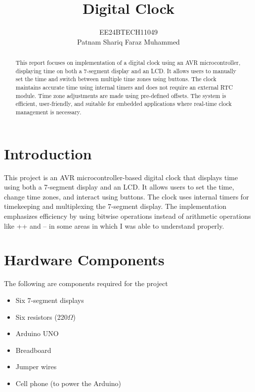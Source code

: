 \documentclass[journal]{IEEEtran}
\numberwithin{equation}{enumi}
\numberwithin{figure}{enumi}
\begin{document}


\title{Digital Clock}
\author{EE24BTECH11049 \\ Patnam Shariq Faraz Muhammed}


{\let\newpage\relax\maketitle}
\begin{abstract}
    This report focuses on implementation of a digital clock using an AVR microcontroller, displaying time on both a 7-segment display and an LCD. It allows users to manually set the time and switch between multiple time zones using buttons. The clock maintains accurate time using internal timers and does not require an external RTC module. Time zone adjustments are made using pre-defined offsets. The system is efficient, user-friendly, and suitable for embedded applications where real-time clock management is necessary. 
\end{abstract}
\newpage
\tableofcontents
\newpage
\section{Introduction}
This project is an AVR microcontroller-based digital clock that displays time using both a 7-segment display and an LCD. It allows users to set the time, change time zones, and interact using buttons. The clock uses internal timers for timekeeping and multiplexing the 7-segment display. The implementation emphasizes efficiency by using bitwise operations instead of arithmetic operations like ++ and -- in some areas in which I was able to understand properly. 

\section{Hardware Components}
The following are components required for the project
\begin{itemize}
    \item Six 7-segment displays
    \item Six resistors (220$\Omega$)
    \item Arduino UNO
    \item Breadboard
    \item Jumper wires
    \item Cell phone (to power the Arduino)
\end{itemize}
\end{document}
